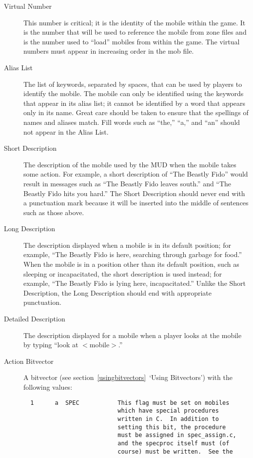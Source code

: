 \documentclass[11pt]{article}
\begin{document}
\begin{description}
\item[Virtual Number] This number is critical; it is the identity of the mobile within the game.  It is the number that will be used to reference the mobile from zone files and is the number used to ``load'' mobiles from within the game.  The virtual numbers must appear in increasing order in the mob file.
\item[Alias List] The list of keywords, separated by spaces, that can be used by players to identify the mobile.  The mobile can only be identified using the keywords that appear in its alias list; it cannot be identified by a word that appears only in its name.  Great care should be taken to ensure that the spellings of names and aliases match. Fill words such as ``the,'' ``a,'' and ``an'' should not appear in the Alias List.
\item[Short Description] The description of the mobile used by the MUD when the mobile takes some action.  For example, a short description of ``The Beastly Fido'' would result in messages such as ``The Beastly Fido leaves south.'' and ``The Beastly Fido hits you hard.''  The Short Description should never end with a punctuation mark because it will be inserted into the middle of sentences such as those above.
\item[Long Description] The description displayed when a mobile is in its default position; for example, ``The Beastly Fido is here, searching through garbage for food.''  When the mobile is in a position other than its default position, such as sleeping or incapacitated, the short description is used instead; for example, ``The Beastly Fido is lying here, incapacitated.''  Unlike the Short Description, the Long Description should end with appropriate punctuation.
\item[Detailed Description] The description displayed for a mobile when a player looks at the mobile by typing ``look at $<$mobile$>$.''
\item[Action Bitvector] A bitvector (see section~\vref{usingbitvectors}~`Using Bitvectors') with the following values:
\begin{verbatim}
  1      a  SPEC           This flag must be set on mobiles
                           which have special procedures
                           written in C.  In addition to
                           setting this bit, the procedure
                           must be assigned in spec_assign.c,
                           and the specproc itself must (of
                           course) must be written.  See the

\end{verbatim}
\end{description}
\end{document}

